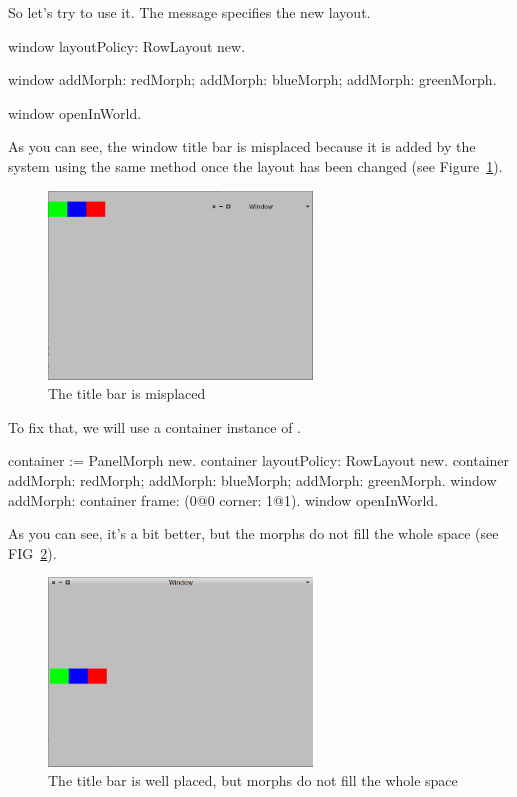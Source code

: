 \documentclass[a4paper,10pt,twoside]{book}
\begin{document}
So let's try to use it. The message  specifies the new layout.
\begin{code}{}
window layoutPolicy: RowLayout new.

window 
	addMorph: redMorph;
	addMorph: blueMorph;
	addMorph: greenMorph.

window openInWorld.
\end{code}

As you can see, the window title bar is misplaced because it is added by the system using the same method once the layout has been changed (see Figure~\ref{fig:rowLayout1}).

\begin{figure}[ht]\centering
	\includegraphics[width=7cm]{RowLayout1}
	\caption{The title bar is misplaced}
	\label{fig:rowLayout1}
\end{figure}

To fix that, we will use a container instance of .
\begin{code}{}
container := PanelMorph new.
container layoutPolicy: RowLayout new.
container 
	addMorph: redMorph;
	addMorph: blueMorph;
	addMorph: greenMorph.
window
	addMorph: container
	frame: (0@0 corner: 1@1).
window openInWorld.
\end{code}

As you can see, it's a bit better, but the morphs do not fill the whole space (see FIG~\ref{fig:rowLayout2}).

\begin{figure}[ht]\centering
	\includegraphics[width=7cm]{RowLayout2}
	\caption{The title bar is well placed, but morphs do not fill the whole space}
	\label{fig:rowLayout2}
\end{figure}
\end{document}
